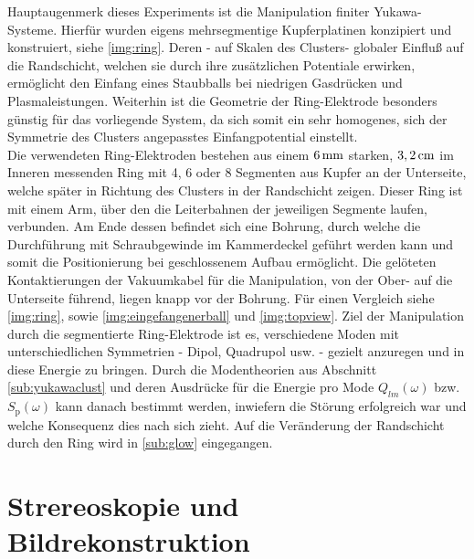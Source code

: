 \documentclass[numbers=noenddot,a4paper,notitlepage,twoside,BCOR15mm]{scrbook}
\newcommand{\ix}[1]{_\text{#1}}
\begin{document}
			Hauptaugenmerk dieses Experiments ist die Manipulation finiter Yukawa-Systeme. Hierf\"ur wurden eigens mehrsegmentige Kupferplatinen konzipiert und konstruiert, siehe \autoref{img:ring}. Deren - auf Skalen des Clusters- globaler Einflu{\ss} auf die Randschicht, welchen sie durch ihre zusätzlichen Potentiale erwirken, erm\"oglicht den Einfang eines Staubballs bei niedrigen Gasdr\"ucken und Plasmaleistungen. Weiterhin ist die Geometrie der Ring-Elektrode besonders g\"unstig f\"ur das vorliegende System, da sich somit ein sehr homogenes, sich der Symmetrie des Clusters angepasstes Einfangpotential einstellt.\\
			Die verwendeten Ring-Elektroden bestehen aus einem $\unit[6]{mm}$ starken, $\unit[3,2]{cm}$ im Inneren messenden Ring mit 4, 6 oder 8 Segmenten aus Kupfer an der Unterseite, welche später in Richtung des Clusters in der Randschicht zeigen. Dieser Ring ist mit einem Arm, über den die Leiterbahnen der jeweiligen Segmente laufen, verbunden. Am Ende dessen befindet sich eine Bohrung, durch welche die Durchführung mit Schraubgewinde im Kammerdeckel geführt werden kann und somit die Positionierung bei geschlossenem Aufbau ermöglicht. Die gelöteten Kontaktierungen der Vakuumkabel für die Manipulation, von der Ober- auf die Unterseite führend, liegen knapp vor der Bohrung. Für einen Vergleich siehe \autoref{img:ring}, sowie  \autoref{img:eingefangenerball}  und \autoref{img:topview}. Ziel der Manipulation durch die segmentierte Ring-Elektrode ist es, verschiedene Moden mit unterschiedlichen Symmetrien - Dipol, Quadrupol usw. - gezielt anzuregen und in diese Energie zu bringen. Durch die Modentheorien aus Abschnitt  \ref{sub:yukawaclust} und deren Ausdrücke für die Energie pro Mode $Q_{lm}\left(\omega\right)$ bzw. $S\ix{p}\left(\omega\right)$ kann danach bestimmt werden, inwiefern die Störung erfolgreich war und welche Konsequenz dies nach sich zieht. Auf die Veränderung der Randschicht durch den Ring wird in \ref{sub:glow} eingegangen.


		\section{Strereoskopie und Bildrekonstruktion}
\end{document}
